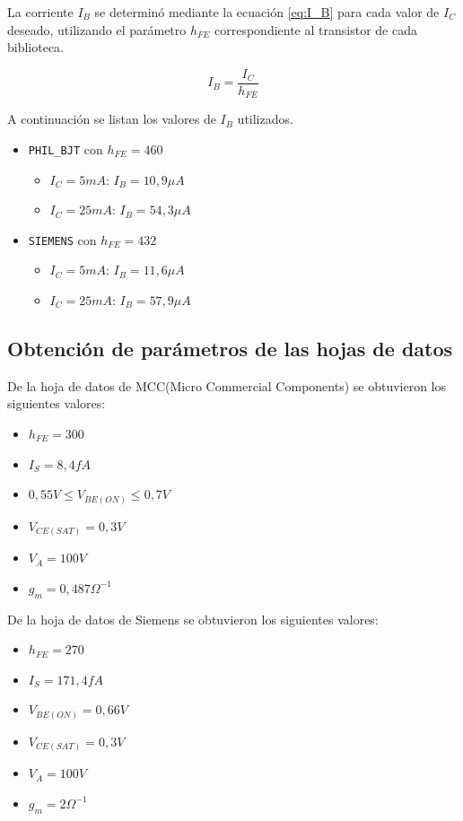\documentclass[10pt,spanish,a4paper,openany,notitlepage]{article}
\begin{document}
La corriente $I_B$ se determinó mediante la ecuación \ref{eq:I_B} para cada valor 
de $I_C$ deseado, utilizando el parámetro $h_{FE}$ correspondiente al transistor de cada biblioteca. 

\begin{equation}
I_B = \frac{I_C}{h_{FE}}
\label{eq:I_B}
\end{equation}

A continuación se listan los valores de $I_B$ utilizados.

\begin{itemize}
\item{\texttt{PHIL\_BJT} con $h_{FE} = 460$}
\begin{itemize}
\item{$I_C = 5 \unit{mA}$}: $I_B = 10,9\unit{\mu A}$
\item{$I_C = 25 \unit{mA}$}: $I_B = 54,3\unit{\mu A}$
\end{itemize}
\item{\texttt{SIEMENS} con $h_{FE} = 432$}
\begin{itemize}
\item{$I_C = 5 \unit{mA}$}: $I_B = 11,6\unit{\mu A}$
\item{$I_C = 25 \unit{mA}$}: $I_B = 57,9\unit{\mu A}$
\end{itemize}
\end{itemize}

\subsection{Obtención de parámetros de las hojas de datos}

De la hoja de datos de MCC(Micro Commercial Components) se obtuvieron los siguientes valores:

\begin{itemize}
\item $h_{FE} =300 $
\item $I_S = 8,4 \unit{fA}$
\item $0,55 \unit{V} \leq V_{BE(ON)} \leq 0,7 \unit{V}$
\item $V_{CE(SAT)} = 0,3 \unit{V}$
\item $V_A = 100 \unit{V}$
\item $g_m = 0,487 \Omega^{-1}$
\end{itemize}

De la hoja de datos de Siemens se obtuvieron los siguientes valores:

\begin{itemize}
\item $h_{FE} =270$
\item $I_S = 171,4 \unit{fA}$
\item $V_{BE(ON)} = 0,66\unit{V}$
\item $V_{CE(SAT)} = 0,3 \unit{V}$
\item $V_A = 100 \unit{V}$
\item $g_m = 2 \Omega^{-1}$
\end{itemize}
\end{document}
